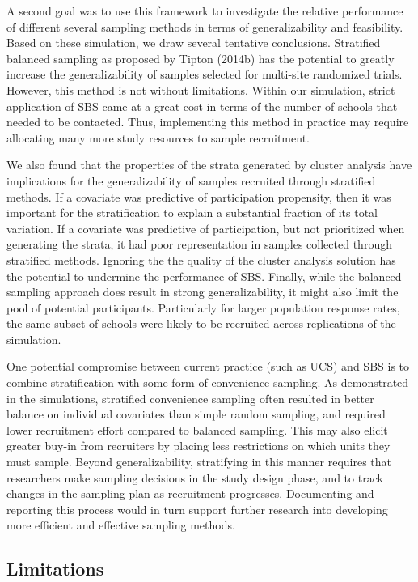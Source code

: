\documentclass[
  english,
  man,floatsintext]{apa6}
\begin{document}
A second goal was to use this framework to investigate the relative performance of different several sampling methods in terms of generalizability and feasibility. Based on these simulation, we draw several tentative conclusions. Stratified balanced sampling as proposed by Tipton (2014b) has the potential to greatly increase the generalizability of samples selected for multi-site randomized trials. However, this method is not without limitations. Within our simulation, strict application of SBS came at a great cost in terms of the number of schools that needed to be contacted. Thus, implementing this method in practice may require allocating many more study resources to sample recruitment.

We also found that the properties of the strata generated by cluster analysis have implications for the generalizability of samples recruited through stratified methods. If a covariate was predictive of participation propensity, then it was important for the stratification to explain a substantial fraction of its total variation. If a covariate was predictive of participation, but not prioritized when generating the strata, it had poor representation in samples collected through stratified methods. Ignoring the the quality of the cluster analysis solution has the potential to undermine the performance of SBS. Finally, while the balanced sampling approach does result in strong generalizability, it might also limit the pool of potential participants. Particularly for larger population response rates, the same subset of schools were likely to be recruited across replications of the simulation.

One potential compromise between current practice (such as UCS) and SBS is to combine stratification with some form of convenience sampling. As demonstrated in the simulations, stratified convenience sampling often resulted in better balance on individual covariates than simple random sampling, and required lower recruitment effort compared to balanced sampling. This may also elicit greater buy-in from recruiters by placing less restrictions on which units they must sample.
Beyond generalizability, stratifying in this manner requires that researchers make sampling decisions in the study design phase, and to track changes in the sampling plan as recruitment progresses. Documenting and reporting this process would in turn support further research into developing more efficient and effective sampling methods.

\hypertarget{limitations}{%
\subsection{Limitations}\label{limitations}}
\end{document}
